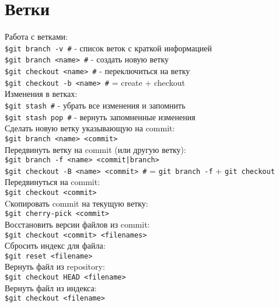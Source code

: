 \documentclass[12pt, a4paper]{article}
\begin{document}
\section{Ветки}

Работа с ветками: \\
\indent \texttt{\$git branch -v \indent \#} - список веток с краткой информацией\\
\indent \texttt{\$git branch <name> \indent \#} - создать новую ветку \\
\indent \texttt{\$git checkout <name> \indent \#} - переключиться на ветку\\
\indent \texttt{\$git checkout -b <name> \indent \#} = create + checkout \\

\noindent Изменения в ветках: \\

\indent \texttt{\$git stash \indent \#} - убрать все изменения и запомнить \\
\indent \texttt{\$git stash pop \indent \#} - вернуть запомненные изменения \\

\noindent Сделать новую ветку указывающую на commit:\\
\indent \texttt{\$git branch <name> <commit>}  \\
Передвинуть ветку на commit (или другую ветку):  \\
\indent \texttt{\$git branch -f <name> <commit|branch>} \\ 
\indent \texttt{\$git checkout -B <name> <commit> \indent \#}  = \texttt{git branch -f}  + \texttt{git checkout} \\
Передвинуться на commit:\\
\indent \texttt{\$git checkout <commit>} \\


\noindent Cкопировать commit на текущую ветку: \\
\indent \texttt{\$git cherry-pick <commit>}   \\

\noindent Восстановить версии файлов из commit:\\
\indent \texttt{\$git checkout <commit> <filenames>} \\
Сбросить индекс для файла: \\
\indent \texttt{\$git reset <filename>} \\
Вернуть файл из repository: \\
\indent \texttt{\$git checkout HEAD <filename>}  \\
Вернуть файл из индекса: \\
\indent \texttt{\$git checkout <filename>}  \\
\end{document}
